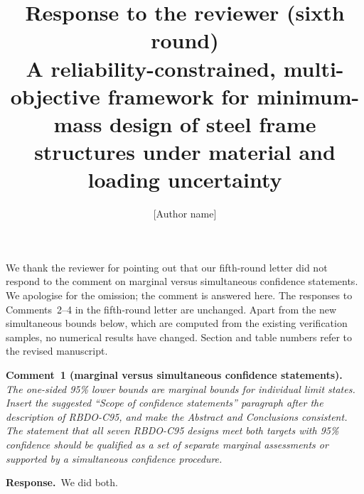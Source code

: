 \documentclass[11pt]{article}
\title{Response to the reviewer (sixth round)\\[0.3em]\large A reliability-constrained, multi-objective
framework for minimum-mass design of steel frame structures under material and loading uncertainty}
\author{[Author name]}
\date{}
\newenvironment{comment}[1]{\par\medskip\noindent\textbf{Comment~#1.}\ \itshape}{\par}
\newcommand{\resp}{\par\noindent\textbf{Response.}\ }
\begin{document}
\maketitle

We thank the reviewer for pointing out that our fifth-round letter did not respond to the comment
on marginal versus simultaneous confidence statements. We apologise for the omission; the comment is
answered here. The responses to Comments~2--4 in the fifth-round letter are unchanged. Apart from the
new simultaneous bounds below, which are computed from the existing verification samples, no
numerical results have changed. Section and table numbers refer to the revised manuscript.

\begin{comment}{1 (marginal versus simultaneous confidence statements)}
The one-sided 95\% lower bounds are marginal bounds for individual limit states. Insert the suggested
``Scope of confidence statements'' paragraph after the description of RBDO-C95, and make the
Abstract and Conclusions consistent. The statement that all seven RBDO-C95 designs meet both
targets with 95\% confidence should be qualified as a set of separate marginal assessments or
supported by a simultaneous confidence procedure.
\end{comment}
\resp We did both.
\end{document}
